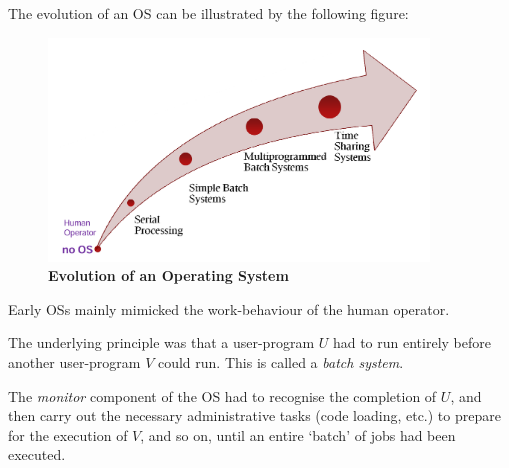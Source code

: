 \documentclass{article}
\begin{document}
The evolution of an OS can be illustrated by the following figure:
\begin{figure}[!h]
    \centering
    \includegraphics[width=0.9\textwidth]{figures/Ch02Figure2.png} %
    \caption{\textbf{Evolution of an Operating System}}
    \label{fig:Ch02Fig2}
\end{figure}

Early OSs mainly mimicked the work-behaviour of the human operator. 

The underlying principle was that
a user-program $U$ had to run entirely before another user-program $V$ could run. This is called a \textit{batch system}.

The \textit{monitor} component of the OS had to recognise the completion of $U$, and then carry out the necessary 
administrative tasks (code loading, etc.) to prepare for the execution of $V$, and so on, until an entire `batch' of jobs
had been executed.
\end{document}

